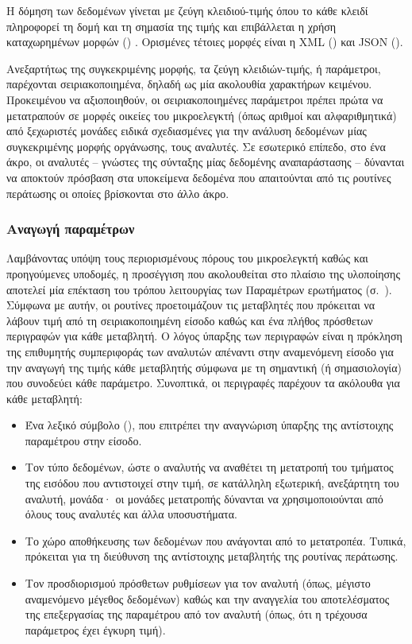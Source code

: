 Η δόμηση των δεδομένων γίνεται με ζεύγη κλειδιού-τιμής όπου το κάθε κλειδί
πληροφορεί τη δομή και τη σημασία της τιμής και επιβάλλεται η χρήση
καταχωρημένων μορφών () \parencite[90--92]{fielding00}. Ορισμένες
τέτοιες μορφές είναι η XML () και JSON
().

Ανεξαρτήτως της συγκεκριμένης μορφής, τα ζεύγη κλειδιών-τιμής, ή παράμετροι,
παρέχονται σειριακοποιημένα, δηλαδή ως μία ακολουθία χαρακτήρων κειμένου.
Προκειμένου να αξιοποιηθούν, οι σειριακοποιημένες παράμετροι πρέπει πρώτα να
μετατραπούν σε μορφές οικείες του μικροελεγκτή (όπως αριθμοί και αλφαριθμητικά)
από ξεχωριστές μονάδες ειδικά σχεδιασμένες για την ανάλυση δεδομένων μίας
συγκεκριμένης μορφής οργάνωσης, τους αναλυτές. Σε εσωτερικό επίπεδο, στο ένα
άκρο, οι αναλυτές -- γνώστες της σύνταξης μίας δεδομένης
αναπαράστασης -- δύνανται να αποκτούν πρόσβαση στα υποκείμενα δεδομένα που
απαιτούνται από τις ρουτίνες περάτωσης οι οποίες βρίσκονται στο άλλο άκρο.


\subsubsection{Αναγωγή παραμέτρων}

Λαμβάνοντας υπόψη τους περιορισμένους πόρους του μικροελεγκτή καθώς και
προηγούμενες υποδομές, η προσέγγιση που ακολουθείται στο πλαίσιο της υλοποίησης
αποτελεί μία επέκταση του τρόπου λειτουργίας των Παραμέτρων ερωτήματος
(σ.~\pageref{ssubsec:network:query-string}). Σύμφωνα με αυτήν, οι ρουτίνες
προετοιμάζουν τις μεταβλητές που πρόκειται να λάβουν τιμή από τη
σειριακοποιημένη είσοδο καθώς και ένα πλήθος πρόσθετων περιγραφών για κάθε
μεταβλητή. Ο λόγος ύπαρξης των περιγραφών είναι η πρόκληση της επιθυμητής
συμπεριφοράς των αναλυτών απέναντι στην αναμενόμενη είσοδο για την αναγωγή της
τιμής κάθε μεταβλητής σύμφωνα με τη σημαντική (ή σημασιολογία) που συνοδεύει
κάθε παράμετρο. Συνοπτικά, οι περιγραφές παρέχουν τα ακόλουθα για κάθε
μεταβλητή:
\begin{itemize}
    \item Ένα λεξικό σύμβολο (), που επιτρέπει την αναγνώριση ύπαρξης
    της αντίστοιχης παραμέτρου στην είσοδο.

    \item Τον τύπο δεδομένων, ώστε ο αναλυτής να αναθέτει τη μετατροπή του
    τμήματος της εισόδου που αντιστοιχεί στην τιμή, σε κατάλληλη εξωτερική,
    ανεξάρτητη του αναλυτή, μονάδα· οι μονάδες μετατροπής δύνανται να
    χρησιμοποιούνται από όλους τους αναλυτές και άλλα υποσυστήματα.

    \item Το χώρο αποθήκευσης των δεδομένων που ανάγονται από το μετατροπέα.
    Τυπικά, πρόκειται για τη διεύθυνση της αντίστοιχης μεταβλητής της ρουτίνας
    περάτωσης.

    \item Τον προσδιορισμού πρόσθετων ρυθμίσεων για τον αναλυτή (όπως, μέγιστο
    αναμενόμενο μέγεθος δεδομένων) καθώς και την αναγγελία του αποτελέσματος της
    επεξεργασίας της παραμέτρου από τον αναλυτή (όπως, ότι η τρέχουσα παράμετρος
    έχει έγκυρη τιμή).
\end{itemize}

